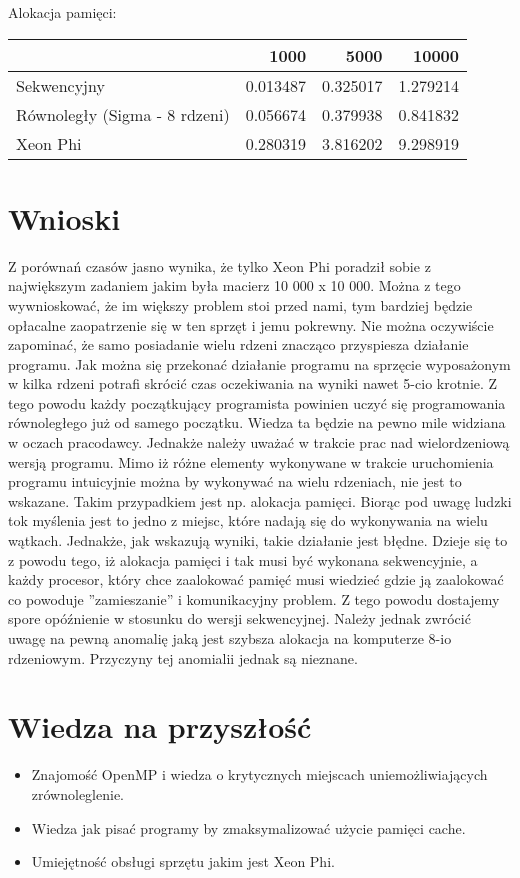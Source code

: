 \documentclass[a4paper]{article}
\begin{document}
Alokacja pamięci: \newline
\begin{tabular}{|l|r|r|r|} \hline
& 1000 & 5000 & 10000 \\ \hline
Sekwencyjny & 0.013487 & 0.325017 & 1.279214\\ \hline
Równoległy (Sigma - 8 rdzeni) & 0.056674 & 0.379938 & 0.841832 \\ \hline
Xeon Phi & 0.280319 & 3.816202 & 9.298919 \\ \hline
\end{tabular} \newline

\section{Wnioski}

Z porównań czasów jasno wynika, że tylko Xeon Phi poradził sobie z największym zadaniem jakim była macierz 10 000 x 10 000. Można z tego wywnioskować, że im większy problem stoi przed nami, tym bardziej będzie opłacalne zaopatrzenie się w ten sprzęt i jemu pokrewny. Nie można oczywiście zapominać, że samo posiadanie wielu rdzeni znacząco przyspiesza działanie programu. Jak można się przekonać działanie programu na sprzęcie wyposażonym w kilka rdzeni potrafi skrócić czas oczekiwania na wyniki nawet 5-cio krotnie. Z tego powodu każdy początkujący programista powinien uczyć się programowania równoległego już od samego początku. Wiedza ta będzie na pewno mile widziana w oczach pracodawcy. \newline
Jednakże należy uważać w trakcie prac nad wielordzeniową wersją programu. Mimo iż różne elementy wykonywane w trakcie uruchomienia programu intuicyjnie można by wykonywać na wielu rdzeniach, nie jest to wskazane. Takim przypadkiem jest np. alokacja pamięci. Biorąc pod uwagę ludzki tok myślenia jest to jedno z miejsc, które nadają się do wykonywania na wielu wątkach. Jednakże, jak wskazują wyniki, takie działanie jest błędne. Dzieje się to z powodu tego, iż alokacja pamięci i tak musi być wykonana sekwencyjnie, a każdy procesor, który chce zaalokować pamięć musi wiedzieć gdzie ją zaalokować co powoduje ''zamieszanie'' i komunikacyjny problem. Z tego powodu dostajemy spore opóźnienie w stosunku do wersji sekwencyjnej. Należy jednak zwrócić uwagę na pewną anomalię jaką jest szybsza alokacja na komputerze 8-io rdzeniowym. Przyczyny tej anomialii jednak są nieznane.

\section{Wiedza na przyszłość}

\begin{itemize}
\item Znajomość OpenMP i wiedza o krytycznych miejscach uniemożliwiających zrównoleglenie.
\item Wiedza jak pisać programy by zmaksymalizować użycie pamięci cache.
\item Umiejętność obsługi sprzętu jakim jest Xeon Phi.
\end{itemize}
\end{document}
